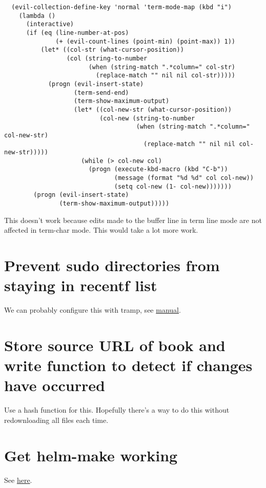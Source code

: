 \documentclass{default}
\begin{document}
\begin{verbatim}
  (evil-collection-define-key 'normal 'term-mode-map (kbd "i")
    (lambda ()
      (interactive)
      (if (eq (line-number-at-pos)
              (+ (evil-count-lines (point-min) (point-max)) 1))
          (let* ((col-str (what-cursor-position))
                 (col (string-to-number
                       (when (string-match ".*column=" col-str)
                         (replace-match "" nil nil col-str)))))
            (progn (evil-insert-state)
                   (term-send-end)
                   (term-show-maximum-output)
                   (let* ((col-new-str (what-cursor-position))
                          (col-new (string-to-number
                                    (when (string-match ".*column=" col-new-str)
                                      (replace-match "" nil nil col-new-str)))))
                     (while (> col-new col)
                       (progn (execute-kbd-macro (kbd "C-b"))
                              (message (format "%d %d" col col-new))
                              (setq col-new (1- col-new)))))))
        (progn (evil-insert-state)
               (term-show-maximum-output)))))
\end{verbatim}

This doesn't work because edits made to the buffer line in term line mode are not affected in
term-char mode. This would take a lot more work.

\section{Prevent sudo directories from staying in recentf list}

We can probably configure this with tramp, see \href{https://www.gnu.org/software/tramp/tramp-emacs.html}{manual}.

\section{Store source URL of book and write function to detect if changes have occurred}

Use a hash function for this. Hopefully there's a way to do this without redownloading all files
each time.

\section{Get helm-make working}

See \href{https://github.com/abo-abo/helm-make}{here}.
\end{document}
